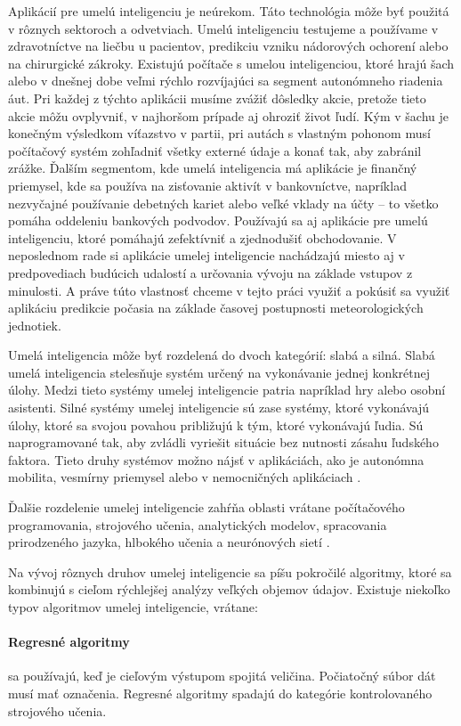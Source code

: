 Aplikácií pre umelú inteligenciu je neúrekom. Táto technológia môže byť použitá v rôznych sektoroch a odvetviach. Umelú inteligenciu testujeme a používame v zdravotníctve na liečbu u pacientov, predikciu vzniku nádorových ochorení alebo na chirurgické zákroky. Existujú počítače s umelou inteligenciou, ktoré hrajú šach alebo v dnešnej dobe veľmi rýchlo rozvíjajúci sa segment autonómneho riadenia áut. Pri každej z týchto aplikácii musíme zvážiť dôsledky akcie, pretože tieto akcie môžu ovplyvniť, v najhoršom prípade aj ohroziť život ľudí. Kým v šachu je konečným výsledkom víťazstvo v partii, pri autách s vlastným pohonom musí počítačový systém zohľadniť všetky externé údaje a konať tak, aby zabránil zrážke. Ďalším segmentom, kde umelá inteligencia má aplikácie je finančný priemysel, kde sa používa na zisťovanie aktivít v bankovníctve, napríklad nezvyčajné používanie debetných kariet alebo veľké vklady na účty – to všetko pomáha oddeleniu bankových podvodov. Používajú sa aj aplikácie pre umelú inteligenciu, ktoré pomáhajú zefektívniť a zjednodušiť obchodovanie. V neposlednom rade si aplikácie umelej inteligencie nachádzajú miesto aj v predpovediach budúcich udalostí a určovania vývoju na základe vstupov z minulosti. A práve túto vlastnosť chceme v tejto práci využiť a pokúsiť sa využiť aplikáciu predikcie počasia na základe časovej postupnosti meteorologických jednotiek.

Umelá inteligencia môže byť rozdelená do dvoch kategórií: slabá a silná. Slabá umelá inteligencia stelesňuje systém určený na vykonávanie jednej konkrétnej úlohy. Medzi tieto systémy umelej inteligencie patria napríklad hry alebo osobní asistenti. Silné systémy umelej inteligencie sú zase systémy, ktoré vykonávajú úlohy, ktoré sa svojou povahou približujú k tým, ktoré vykonávajú ľudia. Sú naprogramované tak, aby zvládli vyriešit situácie bez nutnosti zásahu ľudského faktora. Tieto druhy systémov možno nájsť v aplikáciách, ako je autonómna mobilita, vesmírny priemysel alebo v nemocničných aplikáciach \cite{ai1}.

Ďalšie rozdelenie umelej inteligencie zahŕňa oblasti vrátane počítačového programovania, strojového učenia, analytických modelov, spracovania prirodzeného jazyka, hlbokého učenia a neurónových sietí \cite{ai2}.

Na vývoj rôznych druhov umelej inteligencie sa píšu pokročilé algoritmy, ktoré sa kombinujú s cieľom rýchlejšej analýzy veľkých objemov údajov. Existuje niekoľko typov algoritmov umelej inteligencie, vrátane:
\paragraph{Regresné algoritmy} sa používajú, keď je cieľovým výstupom spojitá veličina. Počiatočný súbor dát musí mať označenia. Regresné algoritmy spadajú do kategórie kontrolovaného strojového učenia.

